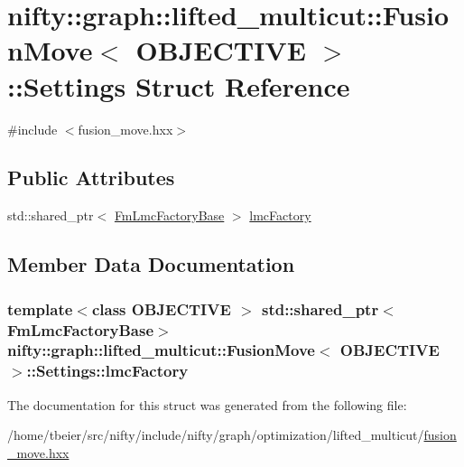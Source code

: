 \hypertarget{structnifty_1_1graph_1_1lifted__multicut_1_1FusionMove_1_1Settings}{}\section{nifty\+:\+:graph\+:\+:lifted\+\_\+multicut\+:\+:Fusion\+Move$<$ O\+B\+J\+E\+C\+T\+I\+V\+E $>$\+:\+:Settings Struct Reference}
\label{structnifty_1_1graph_1_1lifted__multicut_1_1FusionMove_1_1Settings}


{\ttfamily \#include $<$fusion\+\_\+move.\+hxx$>$}

\subsection*{Public Attributes}
\begin{DoxyCompactItemize}
\item 
std\+::shared\+\_\+ptr$<$ \hyperlink{classnifty_1_1graph_1_1lifted__multicut_1_1FusionMove_ac2b4a0ecbc324dd7b5b4a7805c714aae}{Fm\+Lmc\+Factory\+Base} $>$ \hyperlink{structnifty_1_1graph_1_1lifted__multicut_1_1FusionMove_1_1Settings_a9d12a13a7533d214957014185b8f94e7}{lmc\+Factory}
\end{DoxyCompactItemize}


\subsection{Member Data Documentation}
\hypertarget{structnifty_1_1graph_1_1lifted__multicut_1_1FusionMove_1_1Settings_a9d12a13a7533d214957014185b8f94e7}{}
\subsubsection[{lmc\+Factory}]{\setlength{\rightskip}{0pt plus 5cm}template$<$class O\+B\+J\+E\+C\+T\+I\+V\+E $>$ std\+::shared\+\_\+ptr$<${\bf Fm\+Lmc\+Factory\+Base}$>$ {\bf nifty\+::graph\+::lifted\+\_\+multicut\+::\+Fusion\+Move}$<$ O\+B\+J\+E\+C\+T\+I\+V\+E $>$\+::Settings\+::lmc\+Factory}\label{structnifty_1_1graph_1_1lifted__multicut_1_1FusionMove_1_1Settings_a9d12a13a7533d214957014185b8f94e7}


The documentation for this struct was generated from the following file\+:\begin{DoxyCompactItemize}
\item 
/home/tbeier/src/nifty/include/nifty/graph/optimization/lifted\+\_\+multicut/\hyperlink{lifted__multicut_2fusion__move_8hxx}{fusion\+\_\+move.\+hxx}\end{DoxyCompactItemize}
